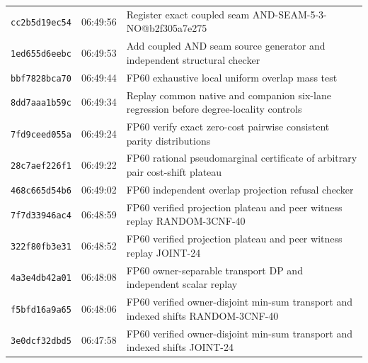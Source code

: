 \documentclass[11pt]{article}
\theoremstyle{remark}
\begin{document}
\begin{longtable}{lll}
\texttt{cc2b5d19ec54} & 06:49:56 & {\footnotesize Register exact coupled seam AND-SEAM-5-3-NO@b2f305a7e275}\\
\texttt{1ed655d6eebc} & 06:49:53 & {\footnotesize Add coupled AND seam source generator and independent structural checker}\\
\texttt{bbf7828bca70} & 06:49:44 & {\footnotesize FP60 exhaustive local uniform overlap mass test}\\
\texttt{8dd7aaa1b59c} & 06:49:34 & {\footnotesize Replay common native and companion six-lane regression before degree-locality controls}\\
\texttt{7fd9ceed055a} & 06:49:24 & {\footnotesize FP60 verify exact zero-cost pairwise consistent parity distributions}\\
\texttt{28c7aef226f1} & 06:49:22 & {\footnotesize FP60 rational pseudomarginal certificate of arbitrary pair cost-shift plateau}\\
\texttt{468c665d54b6} & 06:49:02 & {\footnotesize FP60 independent overlap projection refusal checker}\\
\texttt{7f7d33946ac4} & 06:48:59 & {\footnotesize FP60 verified projection plateau and peer witness replay RANDOM-3CNF-40}\\
\texttt{322f80fb3e31} & 06:48:52 & {\footnotesize FP60 verified projection plateau and peer witness replay JOINT-24}\\
\texttt{4a3e4db42a01} & 06:48:08 & {\footnotesize FP60 owner-separable transport DP and independent scalar replay}\\
\texttt{f5bfd16a9a65} & 06:48:06 & {\footnotesize FP60 verified owner-disjoint min-sum transport and indexed shifts RANDOM-3CNF-40}\\
\texttt{3e0dcf32dbd5} & 06:47:58 & {\footnotesize FP60 verified owner-disjoint min-sum transport and indexed shifts JOINT-24}\\
\bottomrule
\end{longtable}
\end{document}
